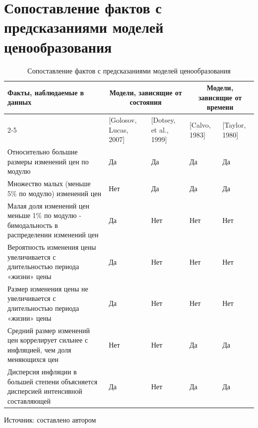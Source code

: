 \section{Сопоставление фактов с предсказаниями моделей ценообразования}\label{app:A3}


\begin{table}[h]
	\centering
	\caption{Сопоставление фактов с предсказаниями моделей ценообразования}
	\label{tab:comparsion}
	\small
	\begin{tabularx}{\textwidth}{|p{4cm}|X|X|X|X|}
		\hline
		Факты, наблюдаемые в данных & \multicolumn{2}{c|}{Модели, зависящие от состояния} & \multicolumn{2}{c|}{Модели, зависящие от времени} \\ \cline{2-5}
		& [Golosov, Lucas, 2007] & [Dotsey, et al., 1999] & [Calvo, 1983] & [Taylor, 1980] \\ \hline
		Относительно большие размеры изменений цен по модулю & Да & Да & Да & Да \\ \hline
		Множество малых (меньше 5\% по модулю) изменений цен & Нет & Да & Да & Да \\ \hline
		Малая доля изменений цен меньше 1\% по модулю - бимодальность в распределении изменений цен & Да & Нет & Нет & Нет \\ \hline
		Вероятность изменения цены увеличивается с длительностью периода «жизни» цены & Да & Нет & Нет & Нет \\ \hline
		Размер изменения цены не увеличивается с длительностью периода «жизни» цены & Да & Нет & Нет & Нет \\ \hline
		Средний размер изменений цен коррелирует сильнее с инфляцией, чем доля меняющихся цен & Нет & Нет & Да & Да \\ \hline
		Дисперсия инфляции в большей степени объясняется дисперсией интенсивной составляющей & Да & Нет & Да & Да \\ \hline
	\end{tabularx}
	
	\vspace{0.5em}
	\footnotesize
	Источник: составлено автором
\end{table}


